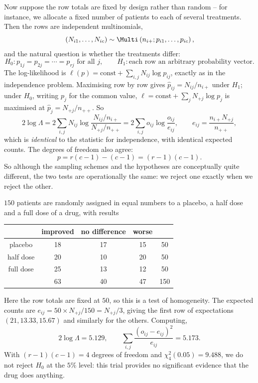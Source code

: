 Now suppose the row totals are fixed by design rather than random -- for instance, we allocate a fixed number of patients to each of several treatments. Then the rows are independent multinomials,
$$
(N_{i1},\dots,N_{ic}) \sim \Multi\left(n_{i+}; p_{i1},\dots,p_{ic}\right),
$$
and the natural question is whether the treatments differ:
$$
H_0 : p_{1j} = p_{2j} = \cdots = p_{rj} \text{ for all } j, \qquad H_1 : \text{each row an arbitrary probability vector}.
$$
The log-likelihood is $\ell(p) = \text{const} + \sum_{i,j}N_{ij}\log p_{ij}$, exactly as in the independence problem. Maximising row by row gives $\hat p_{ij} = N_{ij}/n_{i+}$ under $H_1$; under $H_0$, writing $p_j$ for the common value, $\ell = \text{const}+\sum_j N_{+j}\log p_j$ is maximised at $\hat p_j = N_{+j}/n_{++}$. So
$$
2\log\Lambda = 2\sum_{i,j}N_{ij}\log\frac{N_{ij}/n_{i+}}{N_{+j}/n_{++}} = 2\sum_{i,j}o_{ij}\log\frac{o_{ij}}{e_{ij}}, \qquad e_{ij} = \frac{n_{i+}N_{+j}}{n_{++}},
$$
which is \emph{identical} to the statistic for independence, with identical expected counts. The degrees of freedom also agree:
$$
p = r(c-1) - (c-1) = (r-1)(c-1).
$$
So although the sampling schemes and the hypotheses are conceptually quite different, the two tests are operationally the same: we reject one exactly when we reject the other.

\begin{example}
  $150$ patients are randomly assigned in equal numbers to a placebo, a half dose and a full dose of a drug, with results

  \begin{center}
  \begin{tabular}{c | c c c | c}
              & improved & no difference & worse & \\\hline
    placebo   & 18       & 17            & 15    & 50 \\
    half dose & 20       & 10            & 20    & 50 \\
    full dose & 25       & 13            & 12    & 50 \\\hline
              & 63       & 40            & 47    & 150
  \end{tabular}
  \end{center}

  Here the row totals are fixed at $50$, so this is a test of homogeneity. The expected counts are $e_{ij} = 50 \times N_{+j}/150 = N_{+j}/3$, giving the first row of expectations $(21, 13.33, 15.67)$ and similarly for the others. Computing,
  $$
  2\log\Lambda = 5.129, \qquad \sum_{i,j}\frac{(o_{ij}-e_{ij})^2}{e_{ij}} = 5.173.
  $$
  With $(r-1)(c-1) = 4$ degrees of freedom and $\chi^2_4(0.05) = 9.488$, we do not reject $H_0$ at the $5\%$ level: this trial provides no significant evidence that the drug does anything.
\end{example}


